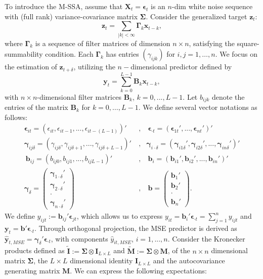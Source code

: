 \documentclass[11pt,a4paper]{article}
\begin{document}
To introduce the M-SSA, assume that $\mathbf{X}_t=\boldsymbol{\epsilon}_t$ is an $n$-dim white noise sequence with (full rank) variance-covariance matrix $\boldsymbol{\Sigma}$. Consider the generalized target $\mathbf{z}_t$:
\[
\mathbf{z}_t=\sum_{|k|<\infty}\boldsymbol{\Gamma}_k\mathbf{x}_{t-k},
\] 
where $\boldsymbol{\Gamma}_k$  is a sequence of filter matrices of dimension  $n\times n$, satisfying the square-summability condition. Each $\boldsymbol{\Gamma}_k$ has entries $(\gamma_{ijk})$ for $i, j = 1, \ldots, n$. We focus on the estimation of $\mathbf{z}_{t+\delta}$, utilizing the $n-$dimensional predictor defined by
\[
\mathbf{y}_t = \sum_{k=0}^{L-1} \mathbf{B}_k \mathbf{x}_{t-k},
\]
with $n\times n$-dimensional filter matrices $\mathbf{B}_k$, $k=0,...,L-1$. Let $b_{ijk}$ denote the entries of the matrix $\mathbf{B}_k$ for $k = 0, \ldots, L-1$. We define several vector notations as follows:
\begin{eqnarray*}
\boldsymbol{\epsilon}_{it}=(\epsilon_{it},\epsilon_{it-1},...,\epsilon_{it-(L-1)})'~&,&~\boldsymbol{\epsilon}_{\cdot t}=(\boldsymbol{\epsilon}_{1t}',...,\boldsymbol{\epsilon}_{nt}')'\\
\boldsymbol{\gamma}_{ij\delta}=(\gamma_{ij\delta},\gamma_{ij\delta+1},...,\gamma_{ij\delta+L-1})'~&,&\boldsymbol{\gamma}_{i\cdot\delta}=(\boldsymbol{\gamma}_{i1\delta}',\boldsymbol{\gamma}_{i2\delta}',...,\boldsymbol{\gamma}_{in\delta}')'\\
~\mathbf{b}_{ij}=(b_{ij0},b_{ij1},...,b_{ijL-1})'~&,&~\mathbf{b}_{i}=(\mathbf{b}_{i1}',\mathbf{b}_{i2}',...,\mathbf{b}_{in}')'\\
\boldsymbol{\gamma}_{\delta}=\left(\begin{array}{c}\boldsymbol{\gamma}_{1\cdot\delta}'\\
\boldsymbol{\gamma}_{2\cdot\delta}'\\
\cdot\\
\boldsymbol{\gamma}_{n\cdot\delta}'\end{array}\right)~&,&~\mathbf{b}=\left(\begin{array}{c}\mathbf{b}_{1}'\\\mathbf{b}_{2}'\\\cdot\\\mathbf{b}_{n}'\end{array}\right).
\end{eqnarray*} 
We define $y_{ijt} := \mathbf{b}_{ij}'\boldsymbol{\epsilon}_{jt}$, which allows us to express $y_{it} = \mathbf{b}_i'\boldsymbol{\epsilon}_{\cdot t} = \sum_{j=1}^n y_{ijt}$ and $\mathbf{y}_t = \mathbf{b}'\boldsymbol{\epsilon}_{\cdot t}$. Through orthogonal projection, the MSE predictor is derived as $\hat{\mathbf{y}}_{t,MSE} = \boldsymbol{\gamma}_{\delta}'\boldsymbol{\epsilon}_{\cdot t}$, with components $\hat{y}_{it,MSE}$, $i=1,...,n$. Consider the Kronecker products defined as $\tilde{\mathbf{I}}:=\boldsymbol{\Sigma}\otimes\mathbf{I}_{L\times L}$ and $\tilde{\mathbf{M}}:=\boldsymbol{\Sigma}\otimes\mathbf{M}$, of the $n\times n$ dimensional matrix $\boldsymbol{\Sigma}$, the $L\times L$ dimensional identity  $\mathbf{I}_{L\times L}$ and the autocovariance generating matrix $\mathbf{M}$. We can express the following expectations: 
\end{document}
